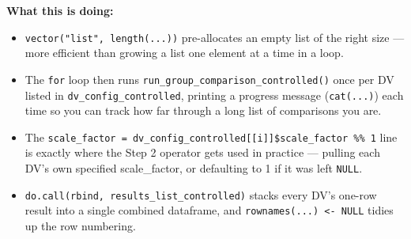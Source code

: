 \documentclass[
  letterpaper,
  DIV=11,
  numbers=noendperiod]{scrreprt}
\newenvironment{Shaded}{\begin{snugshade}}{\end{snugshade}}
\newcommand{\AttributeTok}[1]{\textcolor[rgb]{0.40,0.45,0.13}{#1}}
\newcommand{\ConstantTok}[1]{\textcolor[rgb]{0.56,0.35,0.01}{#1}}
\newcommand{\ControlFlowTok}[1]{\textcolor[rgb]{0.00,0.23,0.31}{\textbf{#1}}}
\newcommand{\DecValTok}[1]{\textcolor[rgb]{0.68,0.00,0.00}{#1}}
\newcommand{\FunctionTok}[1]{\textcolor[rgb]{0.28,0.35,0.67}{#1}}
\newcommand{\NormalTok}[1]{\textcolor[rgb]{0.00,0.23,0.31}{#1}}
\newcommand{\OtherTok}[1]{\textcolor[rgb]{0.00,0.23,0.31}{#1}}
\newcommand{\SpecialCharTok}[1]{\textcolor[rgb]{0.37,0.37,0.37}{#1}}
\newcommand{\StringTok}[1]{\textcolor[rgb]{0.13,0.47,0.30}{#1}}
\begin{document}
\begin{Shaded}
\end{Shaded}

\textbf{What this is doing:}

\begin{itemize}
\item
  \texttt{vector("list",\ length(...))} pre-allocates an empty list of
  the right size --- more efficient than growing a list one element at a
  time in a loop.
\item
  The \texttt{for} loop then runs
  \texttt{run\_group\_comparison\_controlled()} once per DV listed in
  \texttt{dv\_config\_controlled}, printing a progress message
  (\texttt{cat(...)}) each time so you can track how far through a long
  list of comparisons you are.
\item
  The
  \texttt{scale\_factor\ =\ dv\_config\_controlled{[}{[}i{]}{]}\$scale\_factor\ \%\textbar{}\textbar{}\%\ 1}
  line is exactly where the Step 2 operator gets used in practice ---
  pulling each DV's own specified scale\_factor, or defaulting to 1 if
  it was left \texttt{NULL}.
\item
  \texttt{do.call(rbind,\ results\_list\_controlled)} stacks every DV's
  one-row result into a single combined dataframe, and
  \texttt{rownames(...)\ \textless{}-\ NULL} tidies up the row
  numbering.
\end{itemize}
\end{document}
